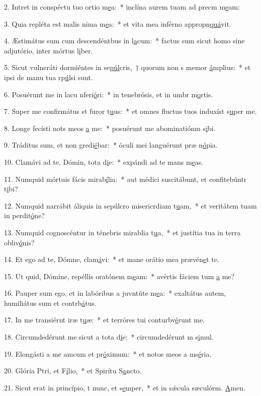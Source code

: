 2. Intret in conspéctu tuo ortio m\uline{e}a:~* inclína aurem tuam ad precm m\uline{e}am:\par 
3. Quia repléta est malis nima m\uline{e}a:~* et vita mea inférno appropn\uline{quá}vit.\par 
4. Æstimátus sum cum descendéntbus in l\uline{a}cum:~* factus sum sicut homo sine adjutório, inter mórtus l\uline{i}ber.\par 
5. Sicut vulneráti dormiéntes in se\uline{púl}cris,~† quorum non s memor \uline{á}mplius:~* et ipsi de manu tua rp\uline{ú}lsi sunt.\par 
6. Posuérunt me in lacu nferi\uline{ó}ri:~* in tenebrósis, et in umbr m\uline{o}rtis.\par 
7. Super me confirmátus st furor t\uline{u}us:~* et omnes fluctus tuos induxíst s\uline{u}per me.\par 
8. Longe fecísti nots meos \uline{a} me:~* posuérunt me abominatiónm s\uline{i}bi.\par 
9. Tráditus sum, et non gredi\uline{é}bar:~* óculi mei languérunt præ n\uline{ó}pia.\par 
10. Clamávi ad te, Dómin, tota d\uline{i}e:~* expándi ad te mans m\uline{e}as.\par 
11. Numquid mórtuis fácis mirab\uline{í}lia:~* aut médici suscitábunt, et confitebúntr t\uline{i}bi?\par 
12. Numquid narrábit áliquis in sepúlcro misericrdiam t\uline{u}am,~* et veritátem tuam in perdit\uline{ó}ne?\par 
13. Numquid cognoscéntur in ténebris mirablia t\uline{u}a,~* et justítia tua in terra obliv\uline{ó}nis?\par 
14. Et ego ad te, Dómne, clam\uline{á}vi:~* et mane orátio mea prævén\uline{e}t te.\par 
15. Ut quid, Dómine, repéllis oratónem m\uline{e}am:~* avértis fáciem tum \uline{a} me?\par 
16. Pauper sum ego, et in labóribus a juvntúte m\uline{e}a:~* exaltátus autem, humiliátus sum et contrb\uline{á}tus.\par 
17. In me transiérnt iræ t\uline{u}æ:~* et terróres tui conturbv\uline{é}runt me.\par 
18. Circumdedérunt me sicut a tota d\uline{i}e:~* circumdedérunt m s\uline{i}mul.\par 
19. Elongásti a me amcum et pr\uline{ó}ximum:~* et notos meos a ms\uline{é}ria.\par 
20. Glória Ptri, et F\uline{í}lio,~* et Spirítu S\uline{a}ncto.\par 
21. Sicut erat in princípio, t nunc, et s\uline{e}mper,~* et in sǽcula sæculórm. \uline{A}men.\par 
